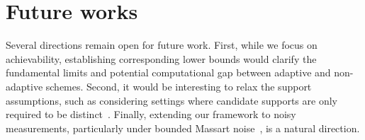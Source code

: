 \documentclass[10pt,a4paper]{amsart}
\newcommand{\xl}[1]{{\color{blue}#1}}
\begin{document}
    





\section{Future works}\label{sec:conclusion}

Several directions remain open for future work. First, while we focus on achievability, establishing corresponding lower bounds would clarify the fundamental limits and potential computational gap between adaptive and non-adaptive schemes. Second, it would be interesting to relax the support assumptions, such as considering settings where candidate supports are only required to be distinct~\cite{pal2021support,polyanskii2021learning}. Finally, extending our framework to noisy measurements, particularly under bounded Massart noise~\cite{awasthi2016learning}, is a natural direction.
\end{document}
